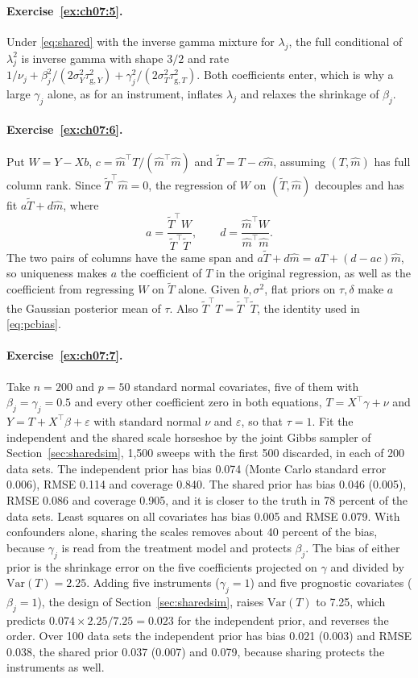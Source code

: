 \paragraph{Exercise~\ref{ex:ch07:5}.} Under \eqref{eq:shared} with the inverse gamma mixture for $\lambda_j$, the full conditional of $\lambda_j^2$ is inverse gamma with shape $3/2$ and rate $1/\nu_j + \beta_j^2/(2\sigma_Y^2\tau_{\mathrm{g},Y}^2) + \gamma_j^2/(2\sigma_T^2\tau_{\mathrm{g},T}^2)$. Both coefficients enter, which is why a large $\gamma_j$ alone, as for an instrument, inflates $\lambda_j$ and relaxes the shrinkage of $\beta_j$.

\paragraph{Exercise~\ref{ex:ch07:6}.} Put $W=Y-Xb$, $c=\hat m^\top T/(\hat m^\top\hat m)$ and $\tilde T=T-c\hat m$, assuming $(T,\hat m)$ has full column rank. Since $\tilde T^\top\hat m=0$, the regression of $W$ on $(\tilde T,\hat m)$ decouples and has fit $a\tilde T+d\hat m$, where
\[
a=\frac{\tilde T^\top W}{\tilde T^\top\tilde T},\qquad d=\frac{\hat m^\top W}{\hat m^\top\hat m}.
\]
The two pairs of columns have the same span and $a\tilde T+d\hat m=aT+(d-ac)\hat m$, so uniqueness makes $a$ the coefficient of $T$ in the original regression, as well as the coefficient from regressing $W$ on $\tilde T$ alone. Given $b,\sigma^2$, flat priors on $\tau,\delta$ make $a$ the Gaussian posterior mean of $\tau$. Also $\tilde T^\top T=\tilde T^\top\tilde T$, the identity used in \eqref{eq:pcbias}.

\paragraph{Exercise~\ref{ex:ch07:7}.} Take $n = 200$ and $p = 50$ standard normal covariates, five of them with $\beta_j = \gamma_j = 0.5$ and every other coefficient zero in both equations, $T = X^\top\gamma + \nu$ and $Y = T + X^\top\beta + \varepsilon$ with standard normal $\nu$ and $\varepsilon$, so that $\tau = 1$. Fit the independent and the shared scale horseshoe by the joint Gibbs sampler of Section~\ref{sec:sharedsim}, 1,500 sweeps with the first 500 discarded, in each of 200 data sets. The independent prior has bias 0.074 (Monte Carlo standard error 0.006), RMSE 0.114 and coverage 0.840. The shared prior has bias 0.046 (0.005), RMSE 0.086 and coverage 0.905, and it is closer to the truth in 78 percent of the data sets. Least squares on all covariates has bias 0.005 and RMSE 0.079. With confounders alone, sharing the scales removes about 40 percent of the bias, because $\gamma_j$ is read from the treatment model and protects $\beta_j$. The bias of either prior is the shrinkage error on the five coefficients projected on $\gamma$ and divided by $\mathrm{Var}(T) = 2.25$. Adding five instruments ($\gamma_j = 1$) and five prognostic covariates ($\beta_j = 1$), the design of Section~\ref{sec:sharedsim}, raises $\mathrm{Var}(T)$ to 7.25, which predicts $0.074 \times 2.25/7.25 = 0.023$ for the independent prior, and reverses the order. Over 100 data sets the independent prior has bias 0.021 (0.003) and RMSE 0.038, the shared prior 0.037 (0.007) and 0.079, because sharing protects the instruments as well.

